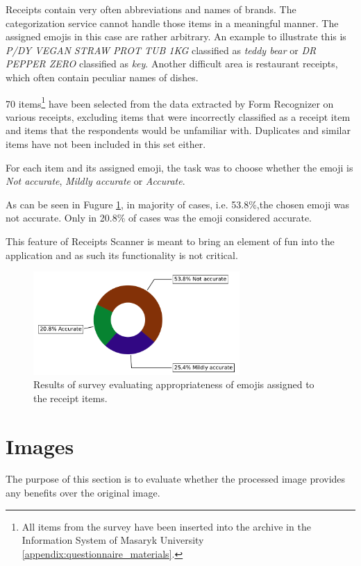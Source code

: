 \documentclass[
  digital, %
  table,   %
  oneside, %
  lof,     %
  lot,     %
]{fithesis3}
\begin{document}
Receipts contain very often abbreviations and names of brands. The categorization service cannot handle those items in a meaningful manner. The assigned emojis in this case are rather arbitrary. An example to illustrate this is \textit{P/DY VEGAN STRAW PROT TUB 1KG} classified as \textit{ teddy bear} or \textit{DR PEPPER ZERO} classified as \textit{ key}. Another difficult area is restaurant receipts, which often contain peculiar names of dishes.

70 items\footnote{All items from the survey have been inserted into the archive in the Information System of Masaryk University \ref{appendix:questionnaire_materials}.} have been selected from the data extracted by Form Recognizer on various receipts, excluding items that were incorrectly classified as a receipt item and items that the respondents would be unfamiliar with. Duplicates and similar items have not been included in this set either.

For each item and its assigned emoji, the task was to choose whether the emoji is \textit{Not accurate}, \textit{Mildly accurate} or \textit{Accurate}.

As can be seen in Fugure \ref{fig:quality_of_emojis}, in majority of cases, i.e. 53.8\%,the chosen emoji was not accurate. Only in 20.8\% of cases was the emoji considered accurate.

This feature of Receipts Scanner is meant to bring an element of fun into the application and as such its functionality is not critical. 

\begin{figure}
    \begin{center}
        \includegraphics[width=0.7\textwidth]{figures/graphs/quality_of_emojis}
    \end{center}
    \caption{Results of survey evaluating appropriateness of emojis assigned to the receipt items.}
    \label{fig:quality_of_emojis}
\end{figure}

\section{Images}
The purpose of this section is to evaluate whether the processed image provides any benefits over the original image.
\end{document}

